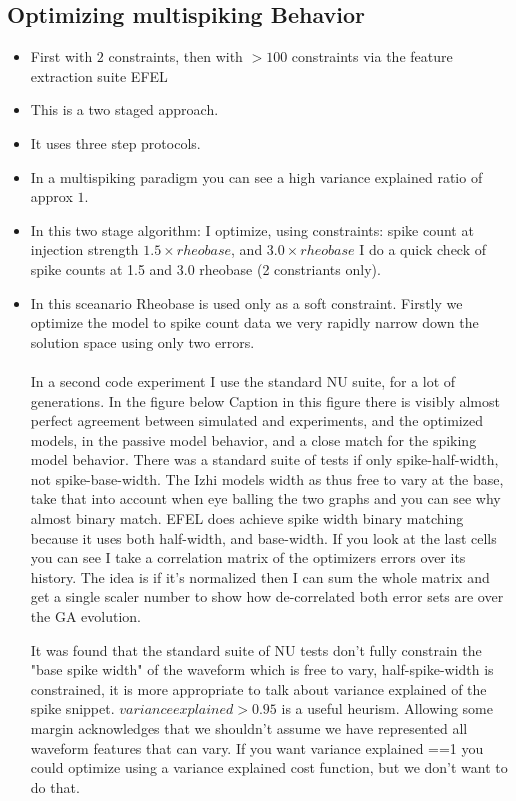 \documentclass{article}
\begin{document}
\subsection{Optimizing multispiking Behavior}
\begin{itemize}
\item First with $2$ constraints, then with $>100$ constraints via the feature extraction suite EFEL

\item This is a two staged approach. 
\item It uses three step protocols.

\item In a multispiking paradigm you can see a high variance explained ratio of approx $1$.  

\item In this two stage algorithm: I optimize, using constraints: spike count at injection strength $1.5 \times rheobase $, and $3.0 \times rheobase $
I do a quick check of spike counts at 1.5 and 3.0 rheobase (2 constriants only).

\item In this sceanario Rheobase is used only as a soft constraint. Firstly we optimize the model to spike count data we very rapidly narrow down the solution space using only two errors. \\
\\
In a second code experiment I use the standard NU suite, for a lot of generations. In the figure below
Caption in this figure there is visibly almost perfect agreement between simulated and experiments, and the optimized models, in the passive model behavior, and a close match for the spiking model behavior. There was a standard suite of tests if only spike-half-width, not spike-base-width. The Izhi models width as thus free to vary at the base, take that into account when eye balling the two graphs and you can see why almost binary match. EFEL does achieve spike width binary matching because it uses both half-width, and base-width. If you look at the last cells you can see I take a correlation matrix of the optimizers errors over its history. The idea is if it's normalized then I can sum the whole matrix and get a single scaler number to show how de-correlated both error sets are over the GA evolution. 

It was found that the standard suite of NU tests don't fully constrain the "base spike width" of the waveform which is free to vary, half-spike-width is constrained, it is more appropriate to talk about variance explained of the spike snippet. $variance explained>0.95$ is a useful heurism. Allowing some margin acknowledges that we shouldn't assume we have represented all waveform features that can vary. If you want variance explained ==1   you could optimize using a variance explained cost function, but we don't want to do that. 
\end{itemize}
\end{document}
